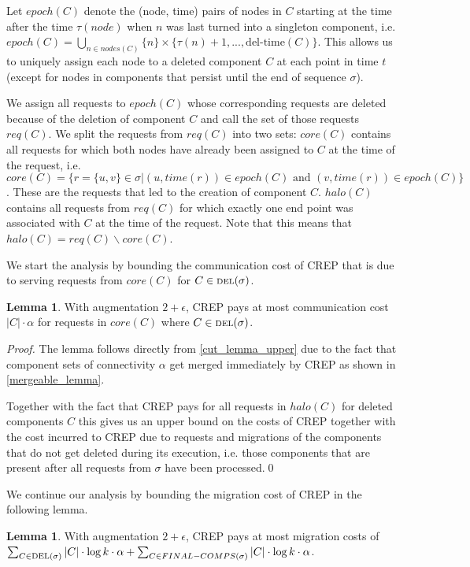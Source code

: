 \documentclass[xcolor=dvipsnames, tikz, 11pt]{article}
\newcommand{\nl}{\newline}
\newcommand{\crep}{C{\scriptsize REP}}
\newcommand{\del}{\text{\scriptsize DEL}}
\theoremstyle{definition}
\newtheorem{lemma}[defi]{Lemma}
\begin{document}
Let $epoch(C)$ denote the (node, time) pairs of nodes in $C$ starting at the time after the time $\tau(node)$ when $n$ was last turned into a singleton component, i.e. $epoch(C)=\bigcup_{n\in nodes(C)}\{n\}\times\{\tau(n)+1,...,\text{del-time}(C)\}$. This allows us to uniquely assign each node to a deleted component $C$ at each point in time $t$ (except for nodes in components that persist until the end of sequence $\sigma$).

We assign all requests to $epoch(C)$ whose corresponding requests are deleted because of the deletion of component $C$ and call the set of those requests $req(C)$.
We split the requests from $req(C)$ into two sets: $core(C)$ contains all requests for which both nodes have already been assigned to $C$ at the time of the request, i.e. $core(C)=\{r=\{u,v\}\in\sigma| (u,time(r))\in epoch(C)\text{ and } (v, time(r))\in epoch(C)\}$. These are the requests that led to the creation of component $C$. 
$halo(C)$ contains all requests from $req(C)$ for which exactly one end point was associated with $C$ at the time of the request. Note that this means that $halo(C)=req(C)\backslash core(C)$.

We start the analysis by bounding the communication cost of \crep{} that is due to serving requests from $core(C)$ for $C\in\del{}(\sigma)$.

\begin{lemma}
	\label{core_comm_upper}
	With augmentation $2+\epsilon$, \crep{} pays at most communication cost $|C|\cdot\alpha$ for requests in $core(C)$ where $C\in\del{}(\sigma)$.
\end{lemma}

\textit{Proof.} The lemma follows directly from \cref{cut_lemma_upper} due to the fact that component sets of connectivity $\alpha$ get merged immediately by \crep{} as shown in \cref{mergeable_lemma}.\nl

Together with the fact that \crep{} pays for all requests in $halo(C)$ for deleted components $C$ this gives us  an upper bound on the costs of \crep{} together with the cost incurred to \crep{} due to requests and migrations of the components that do not get deleted during its execution, i.e. those components that are present after all requests from $\sigma$ have been processed.\qed\nl

We continue our analysis by bounding the migration cost of \crep{} in the following lemma.
\begin{lemma}
	With augmentation $2+\epsilon$, \crep{} pays at most migration costs of $\sum_{C\in\del{}(\sigma)}|C|\cdot\log k\cdot\alpha+\sum_{C\in FINAL-COMPS(\sigma)}|C|\cdot\log k\cdot\alpha$.
\end{lemma}
\end{document}
